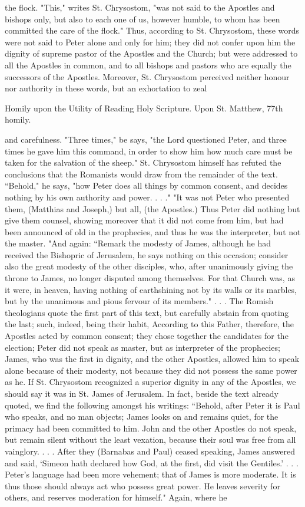 the flock. "This," writes St. Chrysostom, "was not said to the Apostles and bishops only, but also to each one of us, however humble, to whom has been committed the care of the flock." Thus, according to St. Chrysostom, these words were not said to Peter alone and only for him; they did not confer upon him the dignity of supreme pastor of the Apostles and the Church; but were addressed to all the Apostles in common, and to all bishops and pastors who are equally the successors of the Apostles. Moreover, St. Chrysostom perceived neither honour nor authority in these words, but an exhortation to zeal

Homily upon the Utility of Reading Holy Scripture. Upon St. Matthew, 77th homily.

and carefulness. "Three times," be says, "the Lord questioned Peter, and three times he gave him this command, in order to show him how much care must be taken for the salvation of the sheep." St. Chrysostom himself has refuted the conclusions that the Romanists would draw from the remainder of the text. “Behold," he says, "how Peter does all things by common consent, and decides nothing by his own authority and power. . . ." "It was not Peter who presented them, (Matthias and Joseph,) but all, (the Apostles.) Thus Peter did nothing but give them counsel, showing moreover that it did not come from him, but had been announced of old in the prophecies, and thus he was the interpreter, but not the master. "And again: “Remark the modesty of James, although he had received the Bishopric of Jerusalem, he says nothing on this occasion; consider also the great modesty of the other disciples, who, after unanimously giving the throne to James, no longer disputed among themselves. For that Church was, as it were, in heaven, having nothing of earthshining not by its walls or its marbles, but by the unanimous and pious fervour of its members." . . . The Romish theologians quote the first part of this text, but carefully abstain from quoting the last; such, indeed, being their habit, According to this Father, therefore, the Apostles acted by common consent; they chose together the candidates for the election; Peter did not speak as master, but as interpreter of the prophecies; James, who was the first in dignity, and the other Apostles, allowed him to speak alone because of their modesty, not because they did not possess the same power as he. If St. Chrysostom recognized a superior dignity in any of the Apostles, we should say it was in St. James of Jerusalem. In fact, beside the text already quoted, we find the following amongst his writings: “Behold, after Peter it is Paul who speaks, and no man objects; James looks on and remains quiet, for the primacy had been committed to him. John and the other Apostles do not speak, but remain silent without the least vexation, because their soul was free from all vainglory. . . . After they (Barnabas and Paul) ceased speaking, James answered and said, ‘Simeon hath declared how God, at the first, did visit the Gentiles.' . . . Peter's language had been more vehement; that of James is more moderate. It is thus those should always act who possess great power. He leaves severity for others, and reserves moderation for himself." Again, where he 